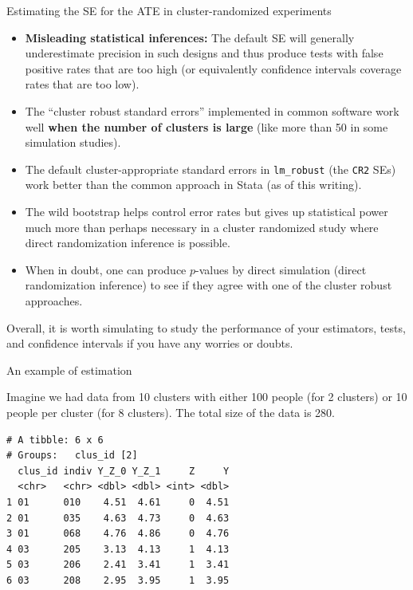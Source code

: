 \documentclass[
  ignorenonframetext,
]{beamer}
\begin{document}
\begin{frame}{Estimating the SE for the ATE in
cluster-randomized experiments}
\protect\hypertarget{estimating-the-se-for-the-ate-in-cluster-randomized-experiments}{}
\begin{itemize}
\item
  \textbf{Misleading statistical inferences:} The default SE will
  generally underestimate precision in such designs and thus produce
  tests with false positive rates that are too high (or equivalently
  confidence intervals coverage rates that are too low).
\item
  The ``cluster robust standard errors'' implemented in common software
  work well \textbf{when the number of clusters is large} (like more
  than 50 in some simulation studies).
\item
  The default cluster-appropriate standard errors in \texttt{lm\_robust}
  (the \texttt{CR2} SEs) work better than the common approach in Stata
  (as of this writing).
\item
  The wild bootstrap helps control error rates but gives up statistical
  power much more than perhaps necessary in a cluster randomized study
  where direct randomization inference is possible.
\item
  When in doubt, one can produce \(p\)-values by direct simulation
  (direct randomization inference) to see if they agree with one of the
  cluster robust approaches.
\end{itemize}

Overall, it is worth simulating to study the performance of your
estimators, tests, and confidence intervals if you have any worries or
doubts.
\end{frame}

\begin{frame}[fragile]{An example of estimation}
\protect\hypertarget{an-example-of-estimation}{}
\scriptsize\normalsize

Imagine we had data from 10 clusters with either 100 people (for 2
clusters) or 10 people per cluster (for 8 clusters). The total size of
the data is 280.

\scriptsize

\begin{verbatim}
# A tibble: 6 x 6
# Groups:   clus_id [2]
  clus_id indiv Y_Z_0 Y_Z_1     Z     Y
  <chr>   <chr> <dbl> <dbl> <int> <dbl>
1 01      010    4.51  4.61     0  4.51
2 01      035    4.63  4.73     0  4.63
3 01      068    4.76  4.86     0  4.76
4 03      205    3.13  4.13     1  4.13
5 03      206    2.41  3.41     1  3.41
6 03      208    2.95  3.95     1  3.95
\end{verbatim}

\normalsize
\end{frame}
\end{document}
